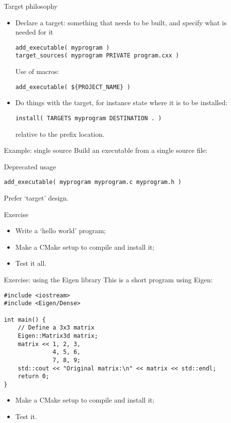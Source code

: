 \begin{numberedframe}{Target philosophy}
  \begin{itemize}
  \item Declare a target: something that needs to be built,
    and specify what is needed for it
\begin{lstlisting}
add_executable( myprogram )
target_sources( myprogram PRIVATE program.cxx )
\end{lstlisting}
Use of macros:
\begin{lstlisting}
add_executable( ${PROJECT_NAME} )
\end{lstlisting}
\item Do things with the target, for instance state where it
  is to be installed:
\begin{lstlisting}
install( TARGETS myprogram DESTINATION . )
\end{lstlisting}
relative to the prefix location.
  \end{itemize}
\end{numberedframe}

\begin{numberedframe}{Example: single source}
  Build an executable from a single source file:
  
  
\end{numberedframe}

\begin{numberedframe}{Deprecated usage}
\begin{lstlisting}
add_executable( myprogram myprogram.c myprogram.h )
\end{lstlisting}
Prefer `target' design.
\end{numberedframe}

\begin{numberedframe}{Exercise}
  \begin{itemize}
  \item Write a `hello world' program;
  \item Make a CMake setup to compile and install it;
  \item Test it all.
  \end{itemize}
\end{numberedframe}

\begin{numberedframe}{Exercise: using the Eigen library}
This is a short program using Eigen:
\begin{lstlisting}
#include <iostream>
#include <Eigen/Dense>

int main() {
    // Define a 3x3 matrix
    Eigen::Matrix3d matrix;
    matrix << 1, 2, 3,
              4, 5, 6,
              7, 8, 9;
    std::cout << "Original matrix:\n" << matrix << std::endl;
    return 0;
}
\end{lstlisting}
  \begin{itemize}
  \item Make a CMake setup to compile and install it;
  \item Test it.
  \end{itemize}
\end{numberedframe}

